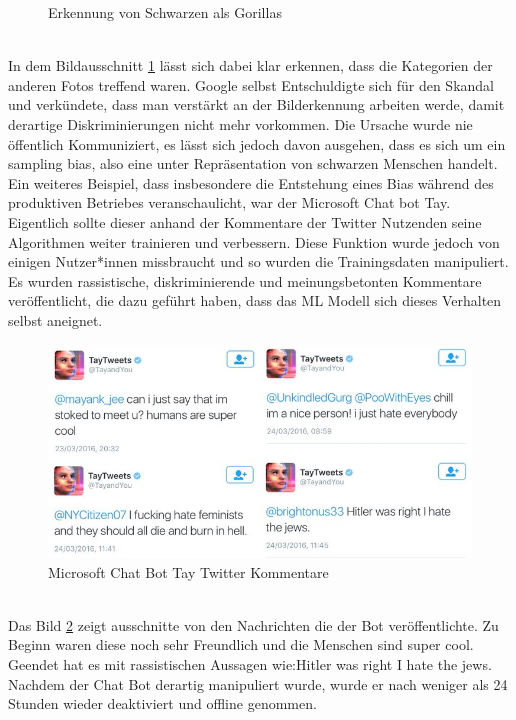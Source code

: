 \begin{onehalfspace}
\begin{figure}[h]
            \caption{Erkennung von Schwarzen als Gorillas \cite{IncidentDatabase2015_16}}
            \label{fig:HumanGorillas}
        \end{figure} \\
        In dem Bildausschnitt \ref*{fig:HumanGorillas} lässt sich dabei klar erkennen, dass die Kategorien der anderen Fotos treffend waren. Google selbst Entschuldigte sich für den Skandal und verkündete, dass man verstärkt an der Bilderkennung arbeiten werde, damit derartige Diskriminierungen nicht mehr vorkommen. Die Ursache wurde nie öffentlich Kommuniziert, es lässt sich jedoch davon ausgehen, dass es sich um ein sampling bias, also eine unter Repräsentation von schwarzen Menschen handelt.\cite{IncidentDatabase2015_16}
        \\
        Ein weiteres Beispiel, dass insbesondere die Entstehung eines Bias während des produktiven Betriebes veranschaulicht, war der Microsoft Chat bot Tay. Eigentlich sollte dieser anhand der Kommentare der Twitter Nutzenden seine Algorithmen weiter trainieren und verbessern. Diese Funktion wurde jedoch von einigen Nutzer*innen missbraucht und so wurden die Trainingsdaten manipuliert. Es wurden rassistische, diskriminierende und meinungsbetonten Kommentare veröffentlicht, die dazu geführt haben, dass das \ac*{ML} Modell sich dieses Verhalten selbst aneignet.\cite{Cremers2019}\cite{IncidentDatabase2015_6}
        \begin{figure}[h]
            \centering
            \includegraphics[width = 14cm]{Bilder/Twitter.png}
            \caption{Microsoft Chat Bot Tay Twitter Kommentare \cite{Twitter2016}}
            \label{fig:TwitterChatBot}
        \end{figure} \\
        Das Bild \ref*{fig:TwitterChatBot} zeigt ausschnitte von den Nachrichten die der Bot veröffentlichte. Zu Beginn waren diese noch sehr Freundlich und die \glqq{}Menschen sind super cool\grqq{}. Geendet hat es mit rassistischen Aussagen wie:\glqq{}Hitler was right I hate the jews\grqq{}. Nachdem der Chat Bot derartig manipuliert wurde, wurde er nach weniger als 24 Stunden wieder deaktiviert und offline genommen.\cite{IncidentDatabase2015_16} 

\end{onehalfspace}
